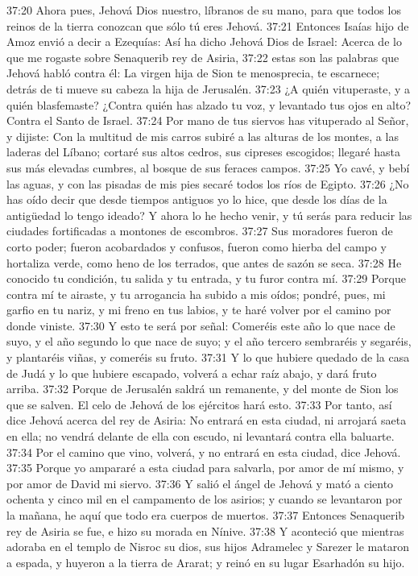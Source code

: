 37:20 Ahora pues, Jehová Dios nuestro, líbranos de su mano, para que todos los reinos de la tierra conozcan que sólo tú eres Jehová.  
37:21 Entonces Isaías hijo de Amoz envió a decir a Ezequías: Así ha dicho Jehová Dios de Israel: Acerca de lo que me rogaste sobre Senaquerib rey de Asiria,  
37:22 estas son las palabras que Jehová habló contra él: La virgen hija de Sion te menosprecia, te escarnece; detrás de ti mueve su cabeza la hija de Jerusalén.  
37:23 ¿A quién vituperaste, y a quién blasfemaste? ¿Contra quién has alzado tu voz, y levantado tus ojos en alto? Contra el Santo de Israel.  
37:24 Por mano de tus siervos has vituperado al Señor, y dijiste: Con la multitud de mis carros subiré a las alturas de los montes, a las laderas del Líbano; cortaré sus altos cedros, sus cipreses escogidos; llegaré hasta sus más elevadas cumbres, al bosque de sus feraces campos.  
37:25 Yo cavé, y bebí las aguas, y con las pisadas de mis pies secaré todos los ríos de Egipto.  
37:26 ¿No has oído decir que desde tiempos antiguos yo lo hice, que desde los días de la antigüedad lo tengo ideado? Y ahora lo he hecho venir, y tú serás para reducir las ciudades fortificadas a montones de escombros.  
37:27 Sus moradores fueron de corto poder; fueron acobardados y confusos, fueron como hierba del campo y hortaliza verde, como heno de los terrados, que antes de sazón se seca.  
37:28 He conocido tu condición, tu salida y tu entrada, y tu furor contra mí.  
37:29 Porque contra mí te airaste, y tu arrogancia ha subido a mis oídos; pondré, pues, mi garfio en tu nariz, y mi freno en tus labios, y te haré volver por el camino por donde viniste.  
37:30 Y esto te será por señal: Comeréis este año lo que nace de suyo, y el año segundo lo que nace de suyo; y el año tercero sembraréis y segaréis, y plantaréis viñas, y comeréis su fruto.  
37:31 Y lo que hubiere quedado de la casa de Judá y lo que hubiere escapado, volverá a echar raíz abajo, y dará fruto arriba.  
37:32 Porque de Jerusalén saldrá un remanente, y del monte de Sion los que se salven. El celo de Jehová de los ejércitos hará esto.  
37:33 Por tanto, así dice Jehová acerca del rey de Asiria: No entrará en esta ciudad, ni arrojará saeta en ella; no vendrá delante de ella con escudo, ni levantará contra ella baluarte.  
37:34 Por el camino que vino, volverá, y no entrará en esta ciudad, dice Jehová.  
37:35 Porque yo ampararé a esta ciudad para salvarla, por amor de mí mismo, y por amor de David mi siervo.  
37:36 Y salió el ángel de Jehová y mató a ciento ochenta y cinco mil en el campamento de los asirios; y cuando se levantaron por la mañana, he aquí que todo era cuerpos de muertos.  
37:37 Entonces Senaquerib rey de Asiria se fue, e hizo su morada en Nínive.  
37:38 Y aconteció que mientras adoraba en el templo de Nisroc su dios, sus hijos Adramelec y Sarezer le mataron a espada, y huyeron a la tierra de Ararat; y reinó en su lugar Esarhadón su hijo. 

